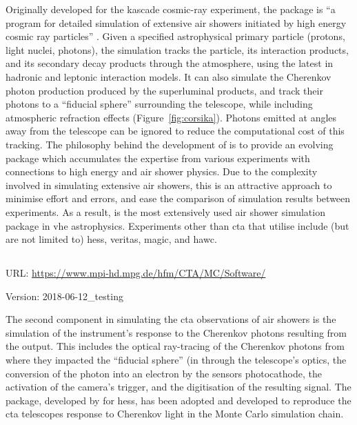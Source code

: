 \noindent Originally developed for the \gls{kascade} cosmic-ray experiment, the  package is ``a program for detailed simulation of extensive air showers initiated by high energy cosmic ray particles'' \cite[][p. i]{heck1998corsika}. Given a specified astrophysical primary particle (protons, light nuclei, photons), the simulation tracks the particle, its interaction products, and its secondary decay products through the atmosphere, using the latest in hadronic and leptonic interaction models. It can also simulate the Cherenkov photon production produced by the superluminal products, and track their photons to a ``fiducial sphere'' surrounding the telescope, while including atmospheric refraction effects (Figure~\ref{fig:corsika}). Photons emitted at angles away from the telescope can be ignored to reduce the computational cost of this tracking. The philosophy behind the development of  is to provide an evolving package which accumulates the expertise from various experiments with connections to high energy and air shower physics. Due to the complexity involved in simulating extensive air showers, this is an attractive approach to minimise effort and errors, and ease the comparison of simulation results between experiments. As a result,  is the most extensively used air shower simulation package in \gls{vhe} astrophysics. Experiments other than \gls{cta} that utilise  include (but are not limited to) \gls{hess}, \gls{veritas}, \gls{magic}, and \gls{hawc}.

\subsection{}
\vspace{-0.7em}
\noindent \hspace{\parindent} {\tiny URL: \url{https://www.mpi-hd.mpg.de/hfm/CTA/MC/Software/} \par}
\noindent \hspace{\parindent} {\tiny Version: 2018-06-12\_testing \par}

\noindent The second component in simulating the \gls{cta} observations of air showers is the simulation of the instrument's response to the Cherenkov photons resulting from the  output. This includes the optical ray-tracing of the Cherenkov photons from where they impacted the ``fiducial sphere'' (in  through the telescope's optics, the conversion of the photon into an electron by the sensors photocathode, the activation of the camera's trigger, and the digitisation of the resulting signal. The  package, developed by \textcite{Bernlohr2008} for \gls{hess}, has been adopted and developed to reproduce the \gls{cta} telescopes response to Cherenkov light in the Monte Carlo simulation chain.

